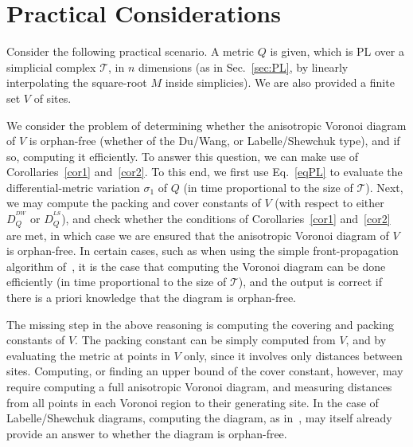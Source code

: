 \documentclass[11pt]{article}
\newcommand{\s}{\sigma}
\newcommand{\T}{\mathcal{T}}
\begin{document}
\section{Practical Considerations}

Consider the following practical scenario. 
A metric $Q$ is given, which is PL over a simplicial complex $\T$, in $n$ dimensions (as in Sec.~\ref{sec:PL}, by linearly interpolating the square-root $M$ inside simplicies). 
We are also provided a finite set $V$ of sites. 

We consider the problem of determining whether the anisotropic Voronoi diagram of $V$ is orphan-free (whether of the Du/Wang, or Labelle/Shewchuk type), and if so, computing it efficiently. 
To answer this question, we can make use of Corollaries~\ref{cor1} and~\ref{cor2}. 
To this end, we first use Eq.~\ref{eqPL} to evaluate the differential-metric variation $\s_1$ of $Q$ (in time proportional to the size of $\T$). 
Next, we may compute the packing and cover constants of $V$ (with respect to either $D_Q^{{ }^{DW}}$ or $D_Q^{{ }^{LS}}$), and check whether  the conditions of Corollaries~\ref{cor1} and~\ref{cor2} are met, 
	in which case we are ensured that the anisotropic Voronoi diagram of $V$ is orphan-free. 
In certain cases, such as when using the simple front-propagation algorithm of~\cite{adt}, it is the case that computing the Voronoi diagram can be done efficiently (in time proportional to the size of $\T$), and the output is correct if there is a priori knowledge that the diagram is orphan-free. 

The missing step in the above reasoning is computing the covering and packing constants of $V$. 
The packing constant can be simply computed from $V$, and by evaluating the metric at points in $V$ only, since it involves only distances between sites. 
Computing, or finding an upper bound of the cover constant, however, may require computing a full anisotropic Voronoi diagram, and measuring distances from all points in each Voronoi region to their generating site. In the case of Labelle/Shewchuk diagrams, computing the diagram, as in~\cite{LS}, may itself already provide an answer to whether the diagram is orphan-free. 
\end{document}
